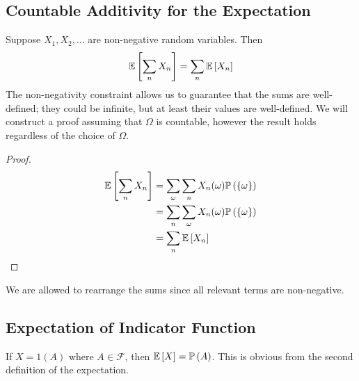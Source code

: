 \subsection{Countable Additivity for the Expectation}
Suppose \(X_1, X_2, \dots\) are non-negative random variables.
Then
\[
	\mathbb{E}\left[{\sum_n X_n}\right] = \sum_n \mathbb{E}\left[{X_n}\right]
\]
The non-negativity constraint allows us to guarantee that the sums are well-defined; they could be infinite, but at least their values are well-defined.
We will construct a proof assuming that \(\Omega\) is countable, however the result holds regardless of the choice of \(\Omega\).
\begin{proof}
	\begin{align*}
		\mathbb{E}\left[{\sum_n X_n}\right] & = \sum_\omega \sum_n X_n(\omega) \mathbb{P}\left({\{ \omega \}}\right) \\
		                    & = \sum_n \sum_\omega X_n(\omega) \mathbb{P}\left({\{ \omega \}}\right) \\
		                    & = \sum_n \mathbb{E}\left[{X_n}\right]
	\end{align*}
\end{proof}
\noindent We are allowed to rearrange the sums since all relevant terms are non-negative.

\subsection{Expectation of Indicator Function}
If \(X = 1(A)\) where \(A \in \mathcal F\), then \(\mathbb{E}\left[{X}\right] = \mathbb{P}\left({A}\right)\).
This is obvious from the second definition of the expectation.

